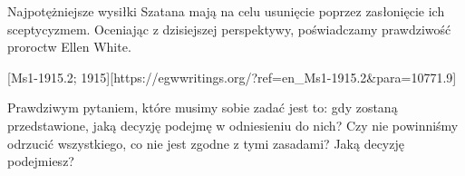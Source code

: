 Najpotężniejsze wysiłki Szatana mają na celu usunięcie  poprzez zasłonięcie ich sceptycyzmem. Oceniając z dzisiejszej perspektywy, poświadczamy prawdziwość proroctw Ellen White.

[Ms1-1915.2; 1915][https://egwwritings.org/?ref=en\_Ms1-1915.2&para=10771.9]

Prawdziwym pytaniem, które musimy sobie zadać  jest to: gdy  zostaną przedstawione, jaką decyzję podejmę w odniesieniu do nich? Czy nie powinniśmy odrzucić wszystkiego, co nie jest zgodne z tymi zasadami? Jaką decyzję podejmiesz?


% 

% 